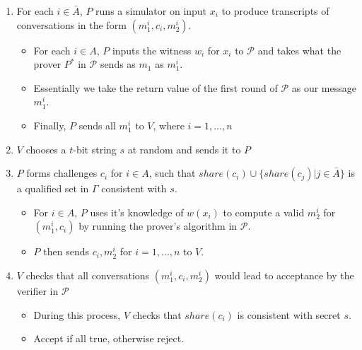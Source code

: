 \begin{enumerate}
    \item For each $i \in \bar A$, $P$ runs a simulator on input $x_i$ to produce transcripts of conversations in the form $(m_1^i, c_i, m_2^i)$.
    \begin{itemize}
        \item For each $i \in A$, $P$ inputs the witness $w_i$ for $x_i$ to $\mathcal P$ and takes what the prover $P^*$ in $\mathcal P$ sends as $m_1$ as $m_1^i$.
        \item Essentially we take the return value of the first round of $\mathcal P$ as our message $m_1^i$.
        \item Finally, $P$ sends all $m_1^i$ to $V$, where $i = 1, \ldots, n$
    \end{itemize}
    \item $V$ chooses a $t$-bit string $s$ at random and sends it to $P$
    \item $P$ forms challenges $c_i$ for $i \in A$, such that $share(c_i) \cup \{share(c_j)|j \in \bar A\}$ is a qualified set in $\Gamma$ consistent with $s$.
    \begin{itemize}
        \item For $i \in A$, $P$ uses it's knowledge of $w(x_i)$ to compute a valid $m_2^i$ for $(m_1^i, c_i)$ by running the prover's algorithm in $\mathcal P$.
        \item $P$ then sends $c_i, m_2^i$ for $i = 1 ,\ldots, n$ to $V$. 
    \end{itemize}
    \item $V$ checks that all conversations $(m_1^i, c_i, m_2^i)$ would lead to acceptance by the verifier in $\mathcal P$
    \begin{itemize}
        \item During this process, $V$ checks that $share(c_i)$ is consistent with secret $s$.
        \item Accept if all true, otherwise reject. 
    \end{itemize}
\end{enumerate}

